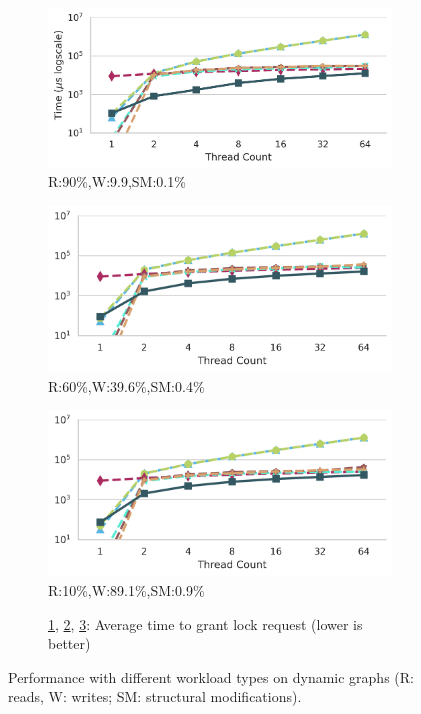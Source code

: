 \begin{figure}[ht]
	
	
		\begin{subfigure}[b]{.33\textwidth}
			\includegraphics[width=\textwidth]{figures/PerformanceCharts/ReadWithModificationsIdleness}
			\caption{R:90\%,W:9.9,SM:0.1\%}
			\label{irm}
		\end{subfigure}
		\begin{subfigure}[b]{.325\textwidth}
			\includegraphics[width=\textwidth]{figures/PerformanceCharts/BalancedWithModificationsIdleness}
			\caption{R:60\%,W:39.6\%,SM:0.4\%}
			\label{ibm}
		\end{subfigure}
		\begin{subfigure}[b]{.325\textwidth}
			\includegraphics[width=\textwidth]{figures/PerformanceCharts/WriteWithModificationsIdleness}
			\caption{R:10\%,W:89.1\%,SM:0.9\%}
			\label{iwm}
		\end{subfigure}
		\begin{subfigure}[b]{\textwidth}
			\caption*{\ref{irm}, \ref{ibm}, \ref{iwm}: Average time to grant lock request  (lower is better)}
		\end{subfigure}
	
		\caption{Performance with different workload types on dynamic graphs  (R: reads, W: writes; SM: structural modifications).}
		\label{dynamicPerf}
	\end{figure}
	
